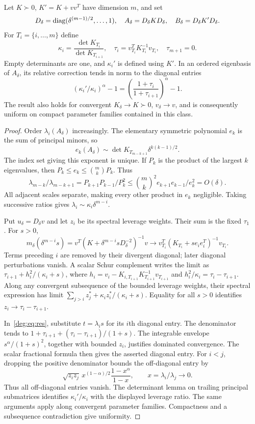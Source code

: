 \begin{lemma}\label{deg:lem:pivots}
Let $K\succ0$, $K'=K+vv^T$ have dimension $m$, and set
\[
 D_\delta=\operatorname{diag}(\delta^{(m-1)/2},\ldots,1),\quad
 A_\delta=D_\delta K D_\delta,\quad B_\delta=D_\delta K'D_\delta.
\]
For $T_i=\{i,\ldots,m\}$ define
\[
 \kappa_i=\frac{\det K_{T_i}}{\det K_{T_{i+1}}},\quad
 \tau_i=v_{T_i}^TK_{T_i}^{-1}v_{T_i},\quad \tau_{m+1}=0.
\]
Empty determinants are one, and $\kappa_i'$ is defined using $K'$.
In an ordered eigenbasis of $A_\delta$, its relative correction tends
in norm to the diagonal entries
\[
 (\kappa_i'/\kappa_i)^\alpha-1
       =\left(\frac{1+\tau_i}{1+\tau_{i+1}}\right)^\alpha-1.
\]
The result also holds for convergent $K_\delta\to K\succ0$,
$v_\delta\to v$, and is consequently uniform on compact parameter
families contained in this class.
\end{lemma}
\begin{proof}
Order $\lambda_i(A_\delta)$ increasingly. The elementary symmetric
polynomial $e_k$ is the sum of principal minors, so
\[
 e_k(A_\delta)\sim\det K_{T_{m-k+1}}\delta^{k(k-1)/2}.
\]
The index set giving this exponent is unique. If $P_k$ is the product
of the largest $k$ eigenvalues, then $P_k\le e_k\le\binom mk P_k$.
Thus
\[
 \lambda_{m-k}/\lambda_{m-k+1}
 =P_{k+1}P_{k-1}/P_k^2
 \le\binom mk^2 e_{k+1}e_{k-1}/e_k^2=O(\delta).
\]
All adjacent scales separate, making every other product in $e_k$
negligible. Taking successive ratios gives
$\lambda_i\sim\kappa_i\delta^{m-i}$.

Put $u_\delta=D_\delta v$ and let $z_i$ be its spectral leverage
weights. Their sum is the fixed $\tau_1$. For $s>0$,
\[
 m_\delta(\delta^{m-i}s)
 =v^T(K+\delta^{m-i}sD_\delta^{-2})^{-1}v
 \longrightarrow v_{T_i}^T(K_{T_i}+se_ie_i^T)^{-1}v_{T_i}.
\]
Terms preceding $i$ are removed by their divergent diagonal; later
diagonal perturbations vanish. A scalar Schur complement writes the
limit as
$\tau_{i+1}+h_i^2/(\kappa_i+s)$, where
$h_i=v_i-K_{i,T_{i+1}}K_{T_{i+1}}^{-1}v_{T_{i+1}}$ and
$h_i^2/\kappa_i=\tau_i-\tau_{i+1}$.
Along any convergent subsequence of the bounded leverage weights,
their spectral expression has limit
$\sum_{j>i}z_j^*+\kappa_i z_i^*/(\kappa_i+s)$.
Equality for all $s>0$ identifies
$z_i\to\tau_i-\tau_{i+1}$.

In~\eqref{deg:eq:res}, substitute $t=\lambda_i s$ for its $i$th diagonal
entry. The denominator tends to
$1+\tau_{i+1}+(\tau_i-\tau_{i+1})/(1+s)$.
The integrable envelope $s^\alpha/(1+s)^2$, together with bounded
$z_i$, justifies dominated convergence. The scalar fractional formula
then gives the asserted diagonal entry. For $i<j$, dropping the positive
denominator bounds the off-diagonal entry by
\[
 \sqrt{z_i z_j}\,x^{(1-\alpha)/2}\frac{1-x^\alpha}{1-x},\qquad
 x=\lambda_i/\lambda_j\longrightarrow0.
\]
Thus all off-diagonal entries vanish. The determinant lemma on trailing
principal submatrices identifies $\kappa_i'/\kappa_i$ with the displayed
leverage ratio. The same arguments apply along convergent parameter
families. Compactness and a subsequence contradiction give uniformity.
\end{proof}

